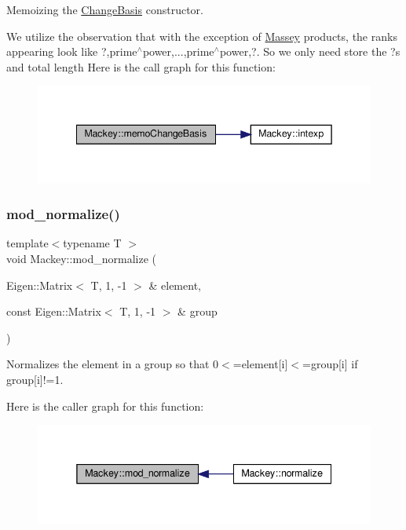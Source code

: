 Memoizing the \hyperlink{classMackey_1_1ChangeBasis}{Change\+Basis} constructor. 

We utilize the observation that with the exception of \hyperlink{classMackey_1_1Massey}{Massey} products, the ranks appearing look like ?,prime$^\wedge$power,...,prime$^\wedge$power,?. So we only need store the ?\textquotesingle{}s and total length Here is the call graph for this function\+:\nopagebreak
\begin{figure}[H]
\begin{center}
\leavevmode
\includegraphics[width=342pt]{namespaceMackey_a70952d513d08b47bc282441a3e9d732c_cgraph}
\end{center}
\end{figure}
\mbox{\label{namespaceMackey_a320b32b8fd44ee75d9f08aa0665c4ec7}} 
\subsubsection{\texorpdfstring{mod\+\_\+normalize()}{mod\_normalize()}}
{\footnotesize\ttfamily template$<$typename T $>$ \\
void Mackey\+::mod\+\_\+normalize (\begin{DoxyParamCaption}\item[{Eigen\+::\+Matrix$<$ T, 1, -\/1 $>$ \&}]{element,  }\item[{const Eigen\+::\+Matrix$<$ T, 1, -\/1 $>$ \&}]{group }\end{DoxyParamCaption})}



Normalizes the element in a group so that 0$<$=element\mbox{[}i\mbox{]}$<$=group\mbox{[}i\mbox{]} if group\mbox{[}i\mbox{]}!=1. 

Here is the caller graph for this function\+:\nopagebreak
\begin{figure}[H]
\begin{center}
\leavevmode
\includegraphics[width=338pt]{namespaceMackey_a320b32b8fd44ee75d9f08aa0665c4ec7_icgraph}
\end{center}
\end{figure}
\mbox{\label{namespaceMackey_a80dbde3a859378ede596b48869ec50d9}} 
